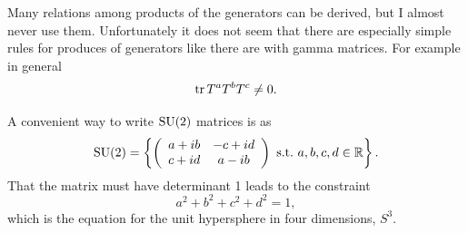Many relations among products of the generators can be derived, but
I almost never use them. Unfortunately it does not seem that there
are especially simple rules for produces of generators like there
are with gamma matrices. For example in general
\begin{equation}
\tr T^aT^bT^c\neq0.
\end{equation}

A convenient way to write $\operatorname{SU}(2)$ matrices is as
\begin{equation}
\operatorname{SU}(2)=\left\{
\left(\begin{array}{cc}
          a+ib   & -c+id  \\ 
          c+id   &  a-ib  \\
            \end{array}\right)~\text{s.t.}~ a,b,c,d\in\mathbb{R} \right\}.
\end{equation} 
That the matrix must have determinant 1 leads to the constraint
\begin{equation}
a^2+b^2+c^2+d^2=1,
\end{equation} 
which is the equation for the unit hypersphere in four dimensions, $S^3$. 

